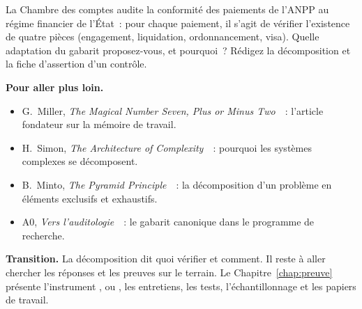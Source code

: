 \begin{boxexo}[title={\ding{45}\quad Exercice~9.10. Adapter le gabarit \niveauexpert}]
La Chambre des comptes audite la conformité des paiements de l'ANPP au
régime financier de l'État~: pour chaque paiement, il s'agit de vérifier
l'existence de quatre pièces (engagement, liquidation, ordonnancement,
visa). Quelle adaptation du gabarit proposez-vous, et pourquoi~? Rédigez
la décomposition et la fiche d'assertion d'un contrôle.
\end{boxexo}

\bigskip

\begin{boxinfo}
\textbf{Pour aller plus loin.}
\begin{itemize}
    \item G.~Miller, \textit{The Magical Number Seven, Plus or Minus
          Two}~\cite{miller1956}~: l'article fondateur sur la mémoire de
          travail.
    \item H.~Simon, \textit{The Architecture of
          Complexity}~\cite{simon1962complexity}~: pourquoi les systèmes
          complexes se décomposent.
    \item B.~Minto, \textit{The Pyramid Principle}~\cite{minto2009pyramid}~:
          la décomposition d'un problème en éléments exclusifs et
          exhaustifs.
    \item A0, \textit{Vers l'auditologie}~\cite{minka2026auditologie}~: le
          gabarit canonique dans le programme de recherche.
\end{itemize}
\end{boxinfo}

\begin{boxinfo}
\textbf{Transition.} La décomposition dit quoi vérifier et comment. Il
reste à aller chercher les réponses et les preuves sur le terrain. Le
Chapitre~\ref{chap:preuve} présente l'instrument \OUI{}, \NON{} ou \NEK{},
les entretiens, les tests, l'échantillonnage et les papiers de travail.
\end{boxinfo}
